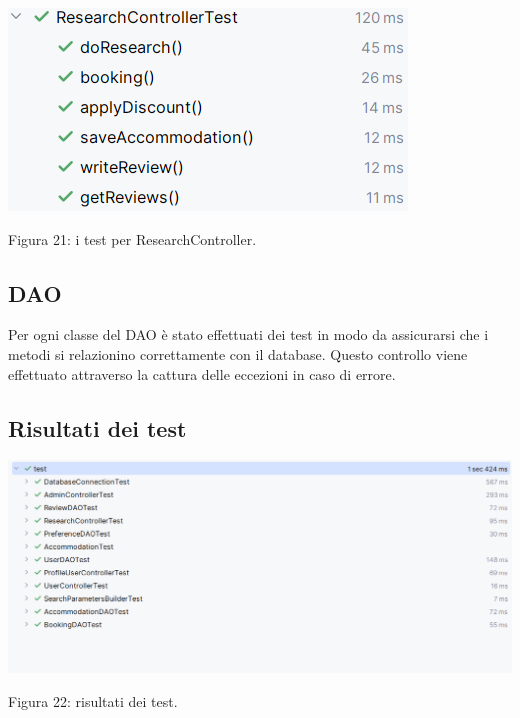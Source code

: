 \documentclass[10pt]{article}
\begin{document}
\begin{center}
\includegraphics[scale=0.55]{test/BusinessLogic/testResearchController}
\par\medskip
Figura 21: i test per ResearchController.
\par\medskip
\end{center}

\subsection{DAO}

Per ogni classe del DAO è stato effettuati dei test in modo da assicurarsi che i metodi si relazionino correttamente con il database. Questo controllo viene effettuato attraverso la cattura delle eccezioni in caso di errore.

\subsection{Risultati dei test}
\par\medskip
\begin{center}
\includegraphics[scale=0.75]{test/BusinessLogic/risultatitest}
\par\medskip
Figura 22: risultati dei test.
\par\medskip
\end{center}
\end{document}
